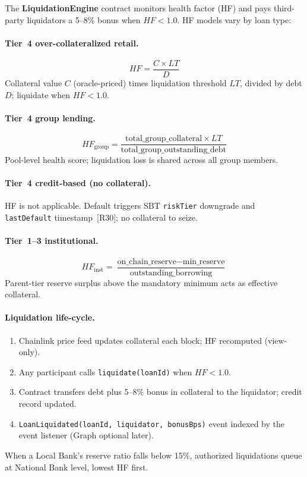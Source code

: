 \documentclass[12pt,a4paper]{report}
\begin{document}
The \textbf{LiquidationEngine} contract monitors health factor (HF) and pays third-party liquidators a 5--8\% bonus when $HF < 1.0$. HF models vary by loan type:

\paragraph{Tier~4 over-collateralized retail.}
\begin{equation}
HF = \frac{C \times LT}{D}
\end{equation}
\noindent Collateral value $C$ (oracle-priced) times liquidation threshold $LT$, divided by debt $D$; liquidate when $HF < 1.0$.

\paragraph{Tier~4 group lending.}
\begin{equation}
HF_{\text{group}} = \frac{\text{total\_group\_collateral} \times LT}{\text{total\_group\_outstanding\_debt}}
\end{equation}
\noindent Pool-level health score; liquidation loss is shared across all group members.

\paragraph{Tier~4 credit-based (no collateral).}
HF is not applicable. Default triggers SBT \texttt{riskTier} downgrade and \texttt{lastDefault} timestamp~[R30]; no collateral to seize.

\paragraph{Tier~1--3 institutional.}
\begin{equation}
HF_{\text{inst}} = \frac{\text{on\_chain\_reserve} - \text{min\_reserve}}{\text{outstanding\_borrowing}}
\end{equation}
\noindent Parent-tier reserve surplus above the mandatory minimum acts as effective collateral.

\paragraph{Liquidation life-cycle.}
\begin{enumerate}[noitemsep]
\item Chainlink price feed updates collateral each block; HF recomputed (view-only).
\item Any participant calls \texttt{liquidate(loanId)} when $HF < 1.0$.
\item Contract transfers debt plus 5--8\% bonus in collateral to the liquidator; credit record updated.
\item \texttt{LoanLiquidated(loanId, liquidator, bonusBps)} event indexed by the event listener (Graph optional later).
\end{enumerate}
\noindent When a Local Bank's reserve ratio falls below 15\%, authorized liquidations queue at National Bank level, lowest HF first.
\end{document}
